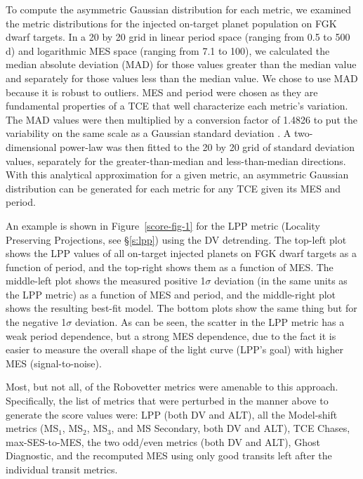 To compute the asymmetric Gaussian distribution for each metric, we examined the metric distributions for the injected on-target planet population on FGK dwarf targets. In a 20 by 20 grid in linear period space (ranging from 0.5 to 500\,d) and logarithmic MES space (ranging from 7.1 to 100), we calculated the median absolute deviation (MAD) for those values greater than the median value and separately for those values less than the median value.  We chose to use MAD because it is robust to outliers. MES and period were chosen as they are fundamental properties of a TCE that well characterize each metric's variation. The MAD values were then multiplied by a conversion factor of 1.4826 to put the variability on the same scale as a Gaussian standard deviation \citep{Hampel1974,Ruppert2010}. A two-dimensional power-law was then fitted to the 20 by 20 grid of standard deviation values, separately for the greater-than-median and less-than-median directions. With this analytical approximation for a given metric, an asymmetric Gaussian distribution can be generated for each metric for any TCE given its MES and period.

An example is shown in Figure~\ref{score-fig-1} for the LPP metric (Locality Preserving Projections, see \S\ref{s:lpp}) using the DV detrending. The top-left plot shows the LPP values of all on-target injected planets on FGK dwarf targets as a function of period, and the top-right shows them as a function of MES. The middle-left plot shows the measured positive 1$\sigma$ deviation (in the same units as the LPP metric) as a function of MES and period, and the middle-right plot shows the resulting best-fit model. The bottom plots show the same thing but for the negative 1$\sigma$ deviation. As can be seen, the scatter in the LPP metric has a weak period dependence, but a strong MES dependence, due to the fact it is easier to measure the overall shape of the light curve (LPP's goal) with higher MES (signal-to-noise). 

Most, but not all, of the Robovetter metrics were amenable to this approach. Specifically, the list of metrics that were perturbed in the manner above to generate the score values were: LPP (both DV and ALT), all the Model-shift metrics (MS$_1$, MS$_2$, MS$_3$, and MS Secondary, both DV and ALT), TCE Chases, max-SES-to-MES, the two odd/even metrics (both DV and ALT), Ghost Diagnostic, and the recomputed MES using only good transits left after the individual transit metrics.

